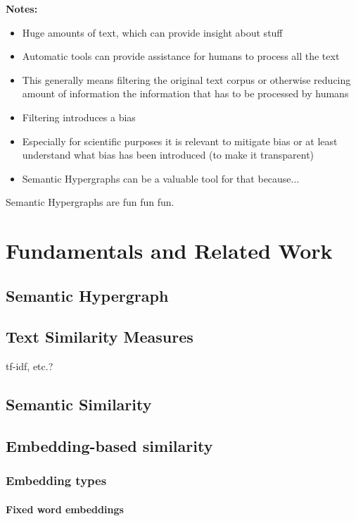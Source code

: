 \documentclass[11pt]{scrreprt}
\newcommand{\citep}{\parencite}  %
\begin{document}
\textbf{Notes:}
\begin{itemize}
	\item Huge amounts of text, which can provide insight about stuff
	\item Automatic tools can provide assistance for humans to process all the text
	\item This generally means filtering the original text corpus or otherwise reducing amount of information the information that has to be processed by humans
	\item Filtering introduces a bias
	\item Especially for scientific purposes it is relevant to mitigate bias or at least understand what bias has been introduced (to make it transparent)
	\item Semantic Hypergraphs can be a valuable tool for that because...
\end{itemize}

Semantic Hypergraphs \citep{menezes_semantic_2021} are fun fun fun. 



\chapter{Fundamentals and Related Work}
\section{Semantic Hypergraph}

\section{Text Similarity Measures}

tf-idf, etc.?


\section{Semantic Similarity}


\section{Embedding-based similarity}

\subsection{Embedding types}

\subsubsection{Fixed word embeddings}
\end{document}
